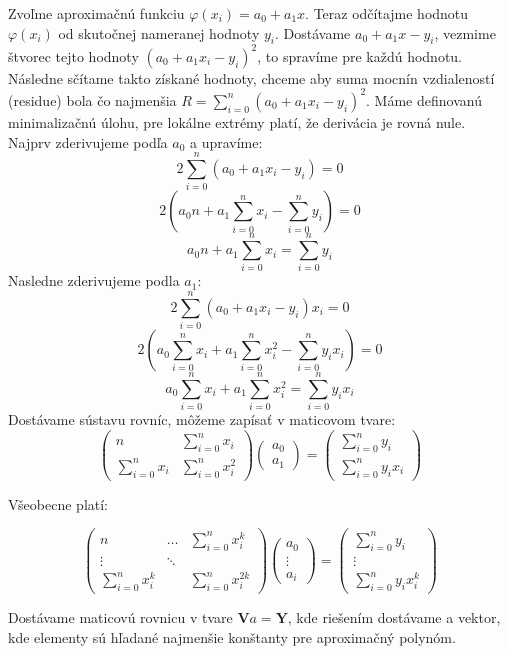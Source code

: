 \documentclass[11pt]{article}
\begin{document}
Zvoľme aproximačnú funkciu \(\varphi(x_i)=a_0 + a_1x\). Teraz odčítajme
hodnotu \(\varphi(x_i)\) od skutočnej nameranej hodnoty \(y_i\).
Dostávame \(a_0 + a_1x - y_i\), vezmime štvorec tejto hodnoty
\((a_0 + a_1x_i - y_i)^{2}\), to spravíme pre každú hodnotu. Následne
sčítame takto získané hodnoty, chceme aby suma mocnín vzdialeností
(residue) bola čo najmenšia \(R=\sum_{i=0}^{n}(a_0 + a_1x_i -y_i)^{2}\).
Máme definovanú minimalizačnú úlohu, pre lokálne extrémy platí, že
derivácia je rovná nule. Najprv zderivujeme podľa \(a_0\) a upravíme:
\[2\sum_{i=0}^{n}(a_0 + a_1x_i -y_i)=0\]
\[2(a_0n + a_1\sum_{i=0}^{n}x_i -\sum_{i=0}^{n}y_i)=0\]
\[a_0n + a_1\sum_{i=0}^{n}x_i =\sum_{i=0}^{n}y_i\] Nasledne zderivujeme
podla \(a_1\): \[2\sum_{i=0}^{n}(a_0 + a_1x_i -y_i)x_i=0\]
\[2(a_0\sum_{i=0}^{n}x_i + a_1\sum_{i=0}^{n}x_i^{2} -\sum_{i=0}^{n}y_ix_i)=0\]
\[a_0\sum_{i=0}^{n}x_i + a_1\sum_{i=0}^{n}x_i^{2}=\sum_{i=0}^{n}y_ix_i\]
Dostávame sústavu rovníc, môžeme zapísať v maticovom tvare:
\[\begin{pmatrix} n & \sum_{i=0}^{n}x_i  \\ \sum_{i=0}^{n}x_i & \sum_{i=0}^{n}x_i^{2}   \end{pmatrix}\begin{pmatrix} a_0 \\ a_1 \end{pmatrix}=\begin{pmatrix} \sum_{i=0}^{n}y_i \\ \sum_{i=0}^{n}y_ix_i\end{pmatrix} \]

Všeobecne platí:

\[\begin{pmatrix}  n &   \dots &\sum_{i=0}^{n}x_i^{k} \\  \vdots & \ddots & \\ \sum_{i=0}^{n}x_i^{k} &        & \sum_{i=0}^{n}x_i^{2k}  \end{pmatrix} \begin{pmatrix}  a_0  \\ \vdots \\ a_{i} \end{pmatrix}=\begin{pmatrix}  \sum_{i=0}^{n}y_i \\ \vdots \\ \sum_{i=0}^{n}y_ix_i^{k} \end{pmatrix}\]

Dostávame maticovú rovnicu v tvare \(\mathbf{V}a= \mathbf{Y}\), kde
riešením dostávame a vektor, kde elementy sú hľadané najmenšie konštanty
pre aproximačný polynóm.
\end{document}
